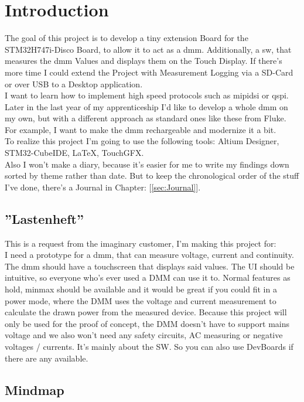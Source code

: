 \chapter{Introduction}
\label{cha:Introduction}


The goal of this project is to develop a tiny extension Board for the STM32H747i-Disco Board, to allow it to act as a \acs{dmm}. Additionally, a \acs{sw}, that measures the \acs{dmm} Values and displays them on the Touch Display. If there's more time I could extend the Project with Measurement Logging via a SD-Card or over USB to a Desktop application.
\\
I want to learn how to implement high speed protocols such as \acs{mipidsi} or \acs{qspi}. Later in the last year of my apprenticeship I'd like to develop a whole \acs{dmm} on my own, but with a different approach as standard ones like these from Fluke. For example, I want to make the \acs{dmm} rechargeable and modernize it a bit. 
\\
To realize this project I'm going to use the following tools: Altium Designer, STM32-CubeIDE, LaTeX, TouchGFX.
\\
Also I won't make a diary, because it's easier for me to write my findings down sorted by theme rather than date. But to keep the chronological order of the stuff I've done, there's a Journal in Chapter: [\ref{sec:Journal}].

\section{''Lastenheft''}
\label{sec:Lastenheft}
This is a request from the imaginary customer, I'm making this project for:
\\
I need a prototype for a \acs{dmm}, that can measure voltage, current and continuity. The \acs{dmm} should have a touchscreen that displays said values. The UI should be intuitive, so everyone who's ever used a DMM can use it to. Normal features as hold, minmax should be available and it would be great if you could fit in a power mode, where the DMM uses the voltage and current measurement to calculate the drawn power from the measured device. Because this project will only be used for the proof of concept, the DMM doesn't have to support mains voltage and we also won't need any safety circuits, AC measuring or negative voltages / currents. It's mainly about the SW. So you can also use DevBoards if there are any available. 

\newpage

\section{Mindmap}
\label{sec:Mindmap}

